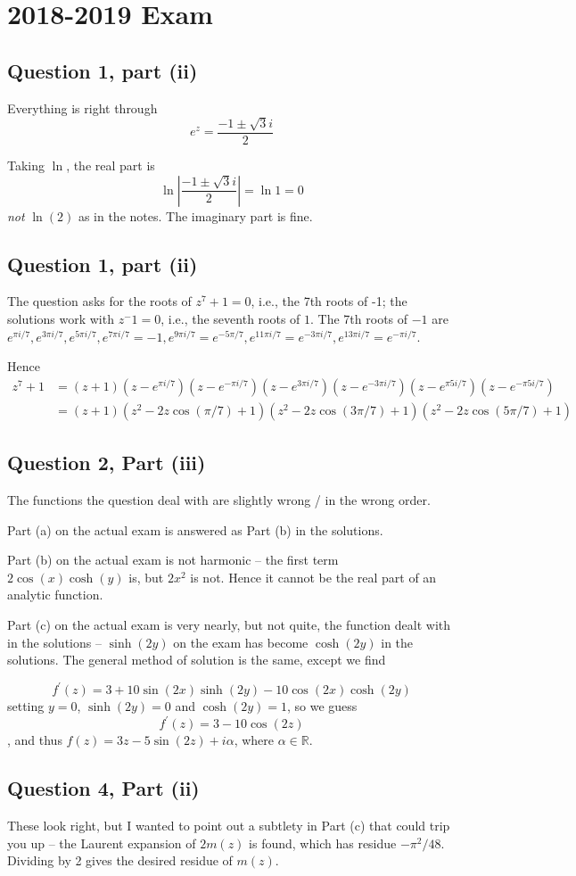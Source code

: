 \documentclass{article}
\newcommand{\R}{\mathbb{R}}
\begin{document}
\section*{2018-2019 Exam}
\subsection*{Question 1, part (ii)} Everything is right through $$e^z=\frac{-1\pm\sqrt{3}i}{2}$$

Taking $\ln$, the real part is
$$\ln |\frac{-1\pm\sqrt{3}i}{2}|=\ln 1 =0$$
\emph{not} $\ln(2)$ as in the notes.  The imaginary part is fine.
\subsection*{Question 1, part (ii)} The question asks for the roots of $z^7+1=0$, i.e., the 7th roots of -1; the solutions work with $z^-1=0$, i.e., the seventh roots of $1$.  The 7th roots of $-1$ are $e^{\pi i/7}, e^{3\pi i/7}, e^{5\pi i/7}, e^{7\pi i/7}=-1, e^{9\pi i/7}=e^{-5\pi/7}, e^{11\pi i/7}=e^{-3\pi i/7}, e^{13\pi i/7}=e^{-\pi i/7}$.

Hence
\begin{align*}z^7+1&=(z+1)(z-e^{\pi i/7})(z-e^{-\pi i/7})(z-e^{3\pi i/7})(z-e^{-3\pi i/7})(z-e^{\pi 5i/7})(z-e^{-\pi 5i/7})\\
  &=(z+1)(z^2-2z\cos(\pi/7)+1)(z^2-2z\cos(3\pi/7)+1)(z^2-2z\cos(5\pi/7)+1)
  \end{align*}

\subsection*{Question 2, Part (iii)}
The functions the question deal with are slightly wrong / in the wrong order.

Part (a) on the actual exam is answered as Part (b) in the solutions.

Part (b) on the actual exam is not harmonic -- the first term $2\cos(x)\cosh(y)$ is, but $2x^2$ is not.  Hence it cannot be the real part of an analytic function.

Part (c) on the actual exam is very nearly, but not quite, the function dealt with in the solutions -- $\sinh(2y)$ on the exam has become $\cosh(2y)$ in the solutions.  The general method of solution is the same, except we find

$$f^\prime(z)=3+10\sin(2x)\sinh(2y)-10\cos(2x)\cosh(2y)$$
setting $y=0$, $\sinh(2y)=0$ and $\cosh(2y)=1$, so we guess
$$f^\prime(z)=3-10\cos(2z)$$, and thus $f(z)=3z-5\sin(2z)+i\alpha$, where $\alpha\in\R$.  

\subsection*{Question 4, Part (ii)}
These look right, but I wanted to point out a subtlety in Part (c) that could trip you up -- the Laurent expansion of $2m(z)$ is found, which has residue $-\pi^2/48$. Dividing by 2 gives the desired residue of $m(z)$.
\end{document}
